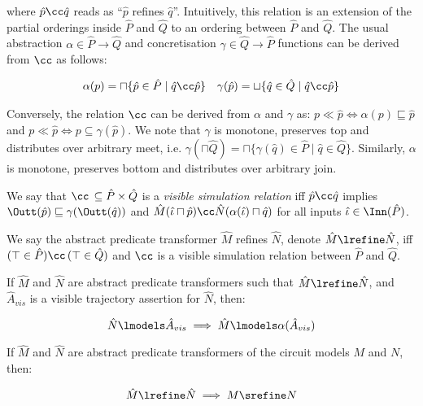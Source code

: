 \noindent where $\hat p \cc \hat q$ reads as ``$\hat p$ refines $\hat q$''. Intuitively, this relation is an extension of the partial orderings inside $\hat P$ and $\hat Q$ to an ordering between $\hat P$ and $\hat Q$. The usual abstraction $\alpha \in \hat P \rightarrow \hat Q$ and concretisation $\gamma \in \hat Q \rightarrow \hat P$ functions can be derived from $\cc$ as follows:

\begin{align*}
\alpha(p) = \sqcap \{ \hat p \in \hat P \mid \hat q \cc \hat p \} && \gamma(\hat p) = \sqcup \{ \hat q \in \hat Q \mid \hat q \cc \hat p \}
\end{align*}

\noindent Conversely, the relation $\cc$ can be derived from $\alpha$ and $\gamma$ as: $p \ll \hat p \iff \alpha(p) \sqsubseteq \hat p$ and $p \ll \hat p \iff p \subseteq \gamma(\hat p)$. We note that $\gamma$ is monotone, preserves top and distributes over arbitrary meet, i.e. $\gamma(\sqcap \hat Q) = \sqcap \{ \gamma(\hat q) \in \hat P \mid \hat q \in \hat Q\}$. Similarly, $\alpha$ is monotone, preserves bottom and distributes over arbitrary join.

We say that $\cc \, \subseteq \hat P \times \hat Q$ is a \textit{visible simulation relation} iff $\hat p \cc \hat q$ implies $\Outt(\hat p) \sqsubseteq \gamma(\Outt(\hat q))$ and $\hat M(\hat \iota \sqcap \hat p) \cc \hat N(\alpha(\hat \iota) \sqcap \hat q)$ for all inputs $\hat \iota \in \Inn(\hat P)$.

We say the abstract predicate transformer $\hat M$ refines $\hat N$, denote $\hat M \lrefine \hat N$, iff $(\top \in \hat P) \cc \, (\top \in \hat Q)$ and $\cc$ is a visible simulation relation between $\hat P$ and $\hat Q$.


\begin{theorem} \label{thm:refinement-lat}
If $\hat M$ and $\hat N$ are abstract predicate transformers such that $\hat M \lrefine \hat N$, and $\hat A_{vis}$ is a visible trajectory assertion for $\hat N$, then:

\begin{equation*}
\hat N \lmodels \hat A_{vis} \implies \hat M \lmodels \alpha(\hat A_{vis})
\end{equation*}
\end{theorem}

\begin{theorem} \label{thm:refinement-impl}
If $\hat M$ and $\hat N$ are abstract predicate transformers of the circuit models $M$ and $N$, then:

\begin{equation*}
\hat M \lrefine \hat N \implies M \srefine N
\end{equation*}
\end{theorem}
